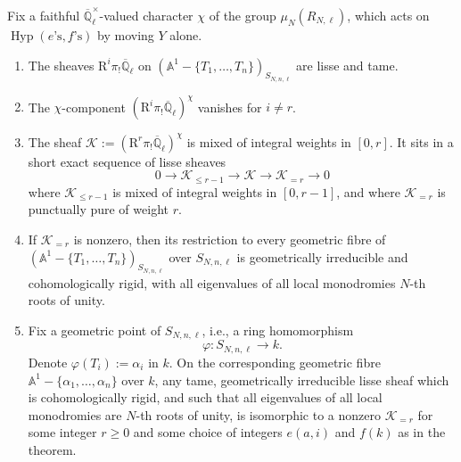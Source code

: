 Fix a faithful \(\overline{\mathbb{Q}}_\ell^{\times}\)-valued character \(\chi\) of the group \(\mu_N(R_{N,\ell})\), which acts on \(\operatorname{Hyp}(e\text{'s},f\text{'s})\) by moving \(Y\) alone.
\begin{enumerate}[label=(\arabic*)]
\item The sheaves \(\mathrm{R}^i\pi_!\overline{\mathbb{Q}}_\ell\) on \((\mathbb{A}^1-\{T_1,\ldots,T_n\})_{S_{N,n,\ell}}\) are lisse and tame.
\item The \(\chi\)-component \((\mathrm{R}^i\pi_!\overline{\mathbb{Q}}_\ell)^\chi\) vanishes for \(i\ne r\).
\item The sheaf \(\mathcal{K}:=(\mathrm{R}^r\pi_!\overline{\mathbb{Q}}_\ell)^\chi\) is mixed of integral weights in \([0,r]\). It sits in a short exact sequence of lisse sheaves
\[
0\to\mathcal{K}_{\leq r-1}\to\mathcal{K}\to\mathcal{K}_{=r}\to0
\]
where \(\mathcal{K}_{\leq r-1}\) is mixed of integral weights in \([0,r-1]\), and where \(\mathcal{K}_{=r}\) is punctually pure of weight \(r\).
\item If \(\mathcal{K}_{=r}\) is nonzero, then its restriction to every geometric fibre of \((\mathbb{A}^1-\{T_1,\ldots,T_n\})_{S_{N,n,\ell}}\) over \(S_{N,n,\ell}\) is geometrically irreducible and cohomologically rigid, with all eigenvalues of all local monodromies \(N\)-th roots of unity.
\item Fix a geometric point of \(S_{N,n,\ell}\), i.e., a ring homomorphism
\[
\varphi:S_{N,n,\ell}\to k.
\]
Denote \(\varphi(T_i):=\alpha_i\) in \(k\). On the corresponding geometric fibre \(\mathbb{A}^1-\{\alpha_1,\ldots,\alpha_n\}\) over \(k\), any tame, geometrically irreducible lisse sheaf which is cohomologically rigid, and such that all eigenvalues of all local monodromies are \(N\)-th roots of unity, is isomorphic to a nonzero \(\mathcal{K}_{=r}\) for some integer \(r\geq0\) and some choice of integers \(e(a,i)\) and \(f(k)\) as in the theorem.
\end{enumerate}
